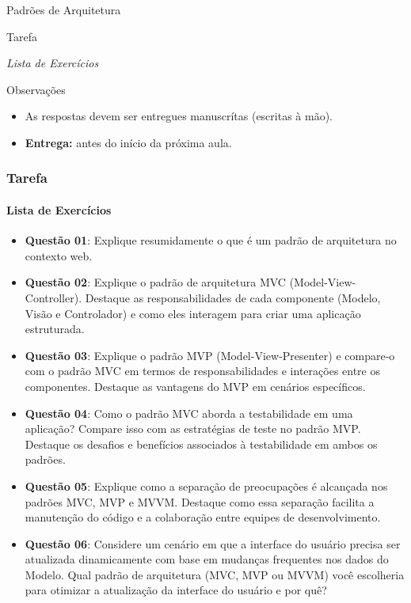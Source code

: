 \documentclass[
	9pt, %
	t, %
]{beamer}
\begin{document}
\begin{frame}
	\begin{center}
		
		\bigskip\bigskip\bigskip\bigskip %
		{\Large Padrões de Arquitetura}
		
		\bigskip\bigskip %
		{\Huge Tarefa}
		
		\smallskip
		{\small \textit{Lista de Exercícios}}

		\bigskip\bigskip
		\begin{block}{Observações}
			\begin{itemize}
				\item As respostas devem ser entregues manuscrítas (escritas à mão).
				\item \textbf{Entrega:} antes do início da próxima aula.
			\end{itemize}
		\end{block}
	\end{center}

\end{frame}

\begin{frame}
	\frametitle{Tarefa}
	\framesubtitle{Lista de Exercícios}
	
	\begin{itemize}
		\item { \small \textbf{Questão 01}: Explique resumidamente o que é um padrão de arquitetura no contexto web. }
		\item { \small \textbf{Questão 02}: Explique o padrão de arquitetura MVC (Model-View-Controller). Destaque as responsabilidades de cada componente (Modelo, Visão e Controlador) e como eles interagem para criar uma aplicação estruturada. }
		\item { \small \textbf{Questão 03}: Explique o padrão MVP (Model-View-Presenter) e compare-o com o padrão MVC em termos de responsabilidades e interações entre os componentes. Destaque as vantagens do MVP em cenários específicos. }
		\item { \small \textbf{Questão 04}: Como o padrão MVC aborda a testabilidade em uma aplicação? Compare isso com as estratégias de teste no padrão MVP. Destaque os desafios e benefícios associados à testabilidade em ambos os padrões. }
		\item { \small \textbf{Questão 05}: Explique como a separação de preocupações é alcançada nos padrões MVC, MVP e MVVM. Destaque como essa separação facilita a manutenção do código e a colaboração entre equipes de desenvolvimento. }
		\item { \small \textbf{Questão 06}: Considere um cenário em que a interface do usuário precisa ser atualizada dinamicamente com base em mudanças frequentes nos dados do Modelo. Qual padrão de arquitetura (MVC, MVP ou MVVM) você escolheria para otimizar a atualização da interface do usuário e por quê? }
	\end{itemize}
	
\end{frame}
\end{document}
